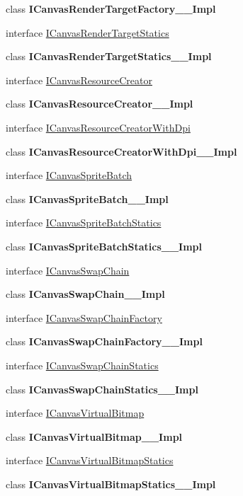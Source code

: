 \begin{DoxyCompactItemize}
\item 
class {\bfseries I\+Canvas\+Render\+Target\+Factory\+\_\+\+\_\+\+Impl}
\item 
interface \hyperlink{interface_microsoft_1_1_graphics_1_1_canvas_1_1_i_canvas_render_target_statics}{I\+Canvas\+Render\+Target\+Statics}
\item 
class {\bfseries I\+Canvas\+Render\+Target\+Statics\+\_\+\+\_\+\+Impl}
\item 
interface \hyperlink{interface_microsoft_1_1_graphics_1_1_canvas_1_1_i_canvas_resource_creator}{I\+Canvas\+Resource\+Creator}
\item 
class {\bfseries I\+Canvas\+Resource\+Creator\+\_\+\+\_\+\+Impl}
\item 
interface \hyperlink{interface_microsoft_1_1_graphics_1_1_canvas_1_1_i_canvas_resource_creator_with_dpi}{I\+Canvas\+Resource\+Creator\+With\+Dpi}
\item 
class {\bfseries I\+Canvas\+Resource\+Creator\+With\+Dpi\+\_\+\+\_\+\+Impl}
\item 
interface \hyperlink{interface_microsoft_1_1_graphics_1_1_canvas_1_1_i_canvas_sprite_batch}{I\+Canvas\+Sprite\+Batch}
\item 
class {\bfseries I\+Canvas\+Sprite\+Batch\+\_\+\+\_\+\+Impl}
\item 
interface \hyperlink{interface_microsoft_1_1_graphics_1_1_canvas_1_1_i_canvas_sprite_batch_statics}{I\+Canvas\+Sprite\+Batch\+Statics}
\item 
class {\bfseries I\+Canvas\+Sprite\+Batch\+Statics\+\_\+\+\_\+\+Impl}
\item 
interface \hyperlink{interface_microsoft_1_1_graphics_1_1_canvas_1_1_i_canvas_swap_chain}{I\+Canvas\+Swap\+Chain}
\item 
class {\bfseries I\+Canvas\+Swap\+Chain\+\_\+\+\_\+\+Impl}
\item 
interface \hyperlink{interface_microsoft_1_1_graphics_1_1_canvas_1_1_i_canvas_swap_chain_factory}{I\+Canvas\+Swap\+Chain\+Factory}
\item 
class {\bfseries I\+Canvas\+Swap\+Chain\+Factory\+\_\+\+\_\+\+Impl}
\item 
interface \hyperlink{interface_microsoft_1_1_graphics_1_1_canvas_1_1_i_canvas_swap_chain_statics}{I\+Canvas\+Swap\+Chain\+Statics}
\item 
class {\bfseries I\+Canvas\+Swap\+Chain\+Statics\+\_\+\+\_\+\+Impl}
\item 
interface \hyperlink{interface_microsoft_1_1_graphics_1_1_canvas_1_1_i_canvas_virtual_bitmap}{I\+Canvas\+Virtual\+Bitmap}
\item 
class {\bfseries I\+Canvas\+Virtual\+Bitmap\+\_\+\+\_\+\+Impl}
\item 
interface \hyperlink{interface_microsoft_1_1_graphics_1_1_canvas_1_1_i_canvas_virtual_bitmap_statics}{I\+Canvas\+Virtual\+Bitmap\+Statics}
\item 
class {\bfseries I\+Canvas\+Virtual\+Bitmap\+Statics\+\_\+\+\_\+\+Impl}
\end{DoxyCompactItemize}
